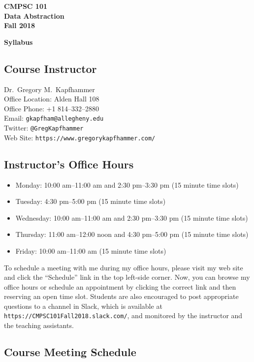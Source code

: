 \documentclass[11pt]{article}
\newcommand{\url}[1]{\lstinline{#1}}
\newcommand{\syllabustitle}[1]
{
  \begin{center}
    \begin{center}
      \bf
      CMPSC 101\\Data Abstraction\\
      Fall 2018\\
      \medskip
    \end{center}
    \bf
    #1
  \end{center}
}
\begin{document}
\thispagestyle{empty}

\syllabustitle{Syllabus}

\subsection*{Course Instructor}
Dr.\ Gregory M.\ Kapfhammer\\
\noindent Office Location: Alden Hall 108 \\
\noindent Office Phone: +1 814--332--2880 \\
\noindent Email: \url{gkapfham@allegheny.edu} \\
\noindent Twitter: \url{@GregKapfhammer} \\
\noindent Web Site: \url{https://www.gregorykapfhammer.com/}

\subsection*{Instructor's Office Hours}

\begin{itemize}
  \itemsep.25em

  \item Monday: 10:00 am--11:00 am and 2:30 pm--3:30 pm (15 minute time slots)

  \item Tuesday: 4:30 pm--5:00 pm (15 minute time slots)

  \item Wednesday: 10:00 am--11:00 am and 2:30 pm--3:30 pm (15 minute time slots)

  \item Thursday: 11:00 am--12:00 noon and 4:30 pm--5:00 pm (15 minute time slots)

  \item Friday: 10:00 am--11:00 am (15 minute time slots)

\end{itemize}

\noindent To schedule a meeting with me during my office hours, please visit my
web site and click the ``Schedule'' link in the top left-side corner. Now, you
can browse my office hours or schedule an appointment by clicking the correct
link and then reserving an open time slot. Students are also encouraged to post
appropriate questions to a channel in Slack, which is available at
\url{https://CMPSC101Fall2018.slack.com/}, and monitored by the instructor
and the teaching assistants.

\subsection*{Course Meeting Schedule}
\end{document}
